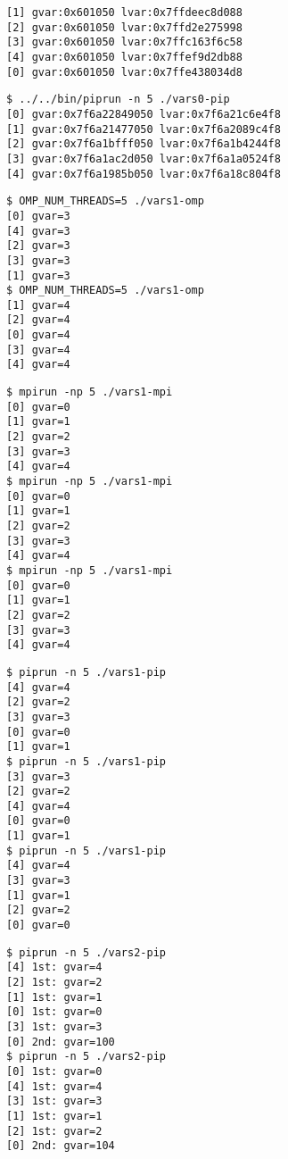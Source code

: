 
\begin{lstlisting}[style=example,caption={Output of ``Vars0 MPI''},label=out:vars0-mpi]
[1] gvar:0x601050 lvar:0x7ffdeec8d088
[2] gvar:0x601050 lvar:0x7ffd2e275998
[3] gvar:0x601050 lvar:0x7ffc163f6c58
[4] gvar:0x601050 lvar:0x7ffef9d2db88
[0] gvar:0x601050 lvar:0x7ffe438034d8
\end{lstlisting}


\begin{lstlisting}[style=example,caption={Output of ``Vars0 PiP''},label=out:vars0-pip]
$ ../../bin/piprun -n 5 ./vars0-pip
[0] gvar:0x7f6a22849050 lvar:0x7f6a21c6e4f8
[1] gvar:0x7f6a21477050 lvar:0x7f6a2089c4f8
[2] gvar:0x7f6a1bfff050 lvar:0x7f6a1b4244f8
[3] gvar:0x7f6a1ac2d050 lvar:0x7f6a1a0524f8
[4] gvar:0x7f6a1985b050 lvar:0x7f6a18c804f8
\end{lstlisting}




\begin{lstlisting}[style=example,caption={Output of ``Vars1 OMP''},label=out:vars1-omp]
$ OMP_NUM_THREADS=5 ./vars1-omp
[0] gvar=3
[4] gvar=3
[2] gvar=3
[3] gvar=3
[1] gvar=3
$ OMP_NUM_THREADS=5 ./vars1-omp
[1] gvar=4
[2] gvar=4
[0] gvar=4
[3] gvar=4
[4] gvar=4
\end{lstlisting}


\begin{lstlisting}[style=example,caption={Output of ``Vars1 MPI''},label=out:vars1-mpi]
$ mpirun -np 5 ./vars1-mpi
[0] gvar=0
[1] gvar=1
[2] gvar=2
[3] gvar=3
[4] gvar=4
$ mpirun -np 5 ./vars1-mpi
[0] gvar=0
[1] gvar=1
[2] gvar=2
[3] gvar=3
[4] gvar=4
$ mpirun -np 5 ./vars1-mpi
[0] gvar=0
[1] gvar=1
[2] gvar=2
[3] gvar=3
[4] gvar=4
\end{lstlisting}


\begin{lstlisting}[style=example,caption={Output of ``Vars1 PiP''},label=out:vars1-pip]
$ piprun -n 5 ./vars1-pip
[4] gvar=4
[2] gvar=2
[3] gvar=3
[0] gvar=0
[1] gvar=1
$ piprun -n 5 ./vars1-pip
[3] gvar=3
[2] gvar=2
[4] gvar=4
[0] gvar=0
[1] gvar=1
$ piprun -n 5 ./vars1-pip
[4] gvar=4
[3] gvar=3
[1] gvar=1
[2] gvar=2
[0] gvar=0
\end{lstlisting}



\begin{lstlisting}[style=example,caption={Output of ``Vars2 PiP''},label=out:vars2-pip]
$ piprun -n 5 ./vars2-pip
[4] 1st: gvar=4
[2] 1st: gvar=2
[1] 1st: gvar=1
[0] 1st: gvar=0
[3] 1st: gvar=3
[0] 2nd: gvar=100
$ piprun -n 5 ./vars2-pip
[0] 1st: gvar=0
[4] 1st: gvar=4
[3] 1st: gvar=3
[1] 1st: gvar=1
[2] 1st: gvar=2
[0] 2nd: gvar=104
\end{lstlisting}

